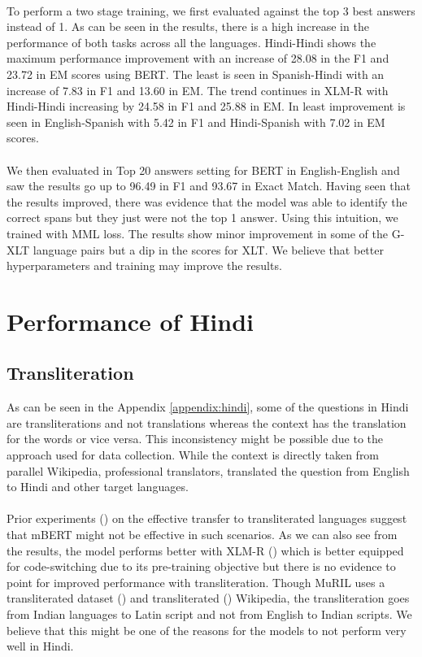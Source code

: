 \documentclass[12pt]{article}   %
\begin{document}
\paragraph{}
To perform a two stage training, we first evaluated against the top 3 best answers instead of 1. As can be seen in the results, there is a high increase in the performance of both tasks across all the languages. Hindi-Hindi shows the maximum performance improvement with an increase of 28.08 in the F1 and 23.72 in EM scores using BERT. The least is seen in Spanish-Hindi with an increase of 7.83 in F1 and 13.60 in EM. The trend continues in XLM-R with Hindi-Hindi increasing by 24.58 in F1 and 25.88 in EM. In least improvement is seen in English-Spanish with 5.42 in F1 and Hindi-Spanish with 7.02 in EM scores.
\\ \\
We then evaluated in Top 20 answers setting for BERT in English-English and saw the results go up to 96.49 in F1 and 93.67 in Exact Match. Having seen that the results improved, there was evidence that the model was able to identify the correct spans but they just were not the top 1 answer. Using this intuition, we trained with MML loss. The results show minor improvement in some of the G-XLT language pairs but a dip in the scores for XLT. We believe that better hyperparameters and training may improve the results.
\section{Performance of Hindi}
\subsection{Transliteration}
As can be seen in the Appendix \ref{appendix:hindi}, some of the questions in Hindi are transliterations and not translations whereas the context has the translation for the words or vice versa. This inconsistency might be possible due to the approach used for data collection. While the context is directly taken from parallel Wikipedia, professional translators, translated the question from English to Hindi and other target languages.
\\ \\
Prior experiments (\cite{pires-etal-2019-multilingual}) on the effective transfer to transliterated languages suggest that mBERT might not be effective in such scenarios. As we can also see from the results, the model performs better with XLM-R (\cite{conneau2019unsupervised}) which is better equipped for code-switching due to its pre-training objective but there is no evidence to point for improved performance with transliteration. Though MuRIL uses a transliterated dataset (\cite{roark-etal-2020-processing}) and transliterated (\cite{indictrans}) Wikipedia, the transliteration goes from Indian languages to Latin script and not from English to Indian scripts. We believe that this might be one of the reasons for the models to not perform very well in Hindi.	
\end{document}
